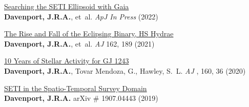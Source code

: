 \documentclass{article}
\begin{document}
\begin{llist}
\clearpage



\begin{etaremune}[leftmargin=10pt]

%


\item {\sc \href{https://arxiv.org/abs/2206.04092}{\color{NavyBlue}Searching the SETI Ellipsoid with Gaia}}\\
{\bf Davenport, J.R.A.}, et~al. {\em ApJ In Press} (2022)



\item{\sc \href{https://arxiv.org/abs/2107.10954}{\color{NavyBlue}The Rise and Fall of the Eclipsing Binary, HS Hydrae}}\\
{\bf Davenport, J.R.A.}, et~al. {\em AJ} 162, 189 (2021)


\item{\sc \href{https://arxiv.org/abs/2005.10281}{\color{NavyBlue}10 Years of Stellar Activity for GJ 1243}}\\
{\bf Davenport, J.R.A.}, Tovar Mendoza, G., Hawley, S.~L. {\em AJ }, 160, 36 (2020)



\item{\sc \href{https://arxiv.org/abs/1907.04443}{\color{NavyBlue}SETI in the Spatio-Temporal Survey Domain}}\\
{\bf Davenport, J.R.A.} arXiv \# 1907.04443 (2019)



\end{etaremune}
\end{llist}
\end{document}
